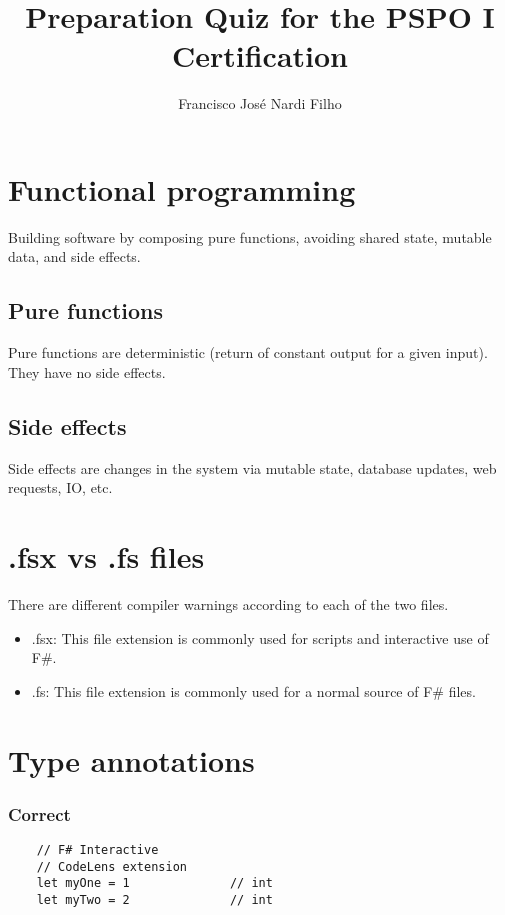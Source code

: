 \documentclass[a4paper,11pt]{article}
\begin{document}
\title{\bf{Preparation Quiz for the PSPO I Certification}}
\author{Francisco Jos\'e Nardi Filho}
\maketitle

\tableofcontents
\newpage

\section{Functional programming}
Building software by composing pure functions, avoiding shared state, mutable data, and side effects.
\subsection{Pure functions}
Pure functions are deterministic (return of constant output for a given input). They have no side effects.
\subsection{Side effects}
Side effects are changes in the system via mutable state, database updates, web requests, IO, etc.

\section{.fsx vs .fs files}
There are different compiler warnings according to each of the two files.
\begin{itemize}
    \item .fsx: This file extension is commonly used for scripts and interactive use of F\#.
    \item .fs: This file extension is commonly used for a normal source of F\# files.
\end{itemize}



\section{Type annotations}
\subsubsection*{Correct}
\lstset{language=FSharp}
\begin{lstlisting}
    // F# Interactive 
    // CodeLens extension
    let myOne = 1              // int
    let myTwo = 2              // int
\end{lstlisting}
\end{document}
